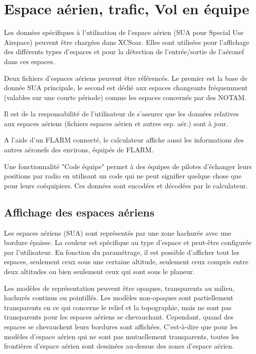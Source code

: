 \chapter{Espace aérien, trafic, Vol en équipe}\label{cha:airspace}
Les données spécifiques à l'utilisation de l'espace aérien (SUA pour Special Use Airspace) peuvent être chargées dans XCSoar. Elles sont utilisées pour l'affichage des différents types d'espaces et pour la détection de l'entrée/sortie de l'aéronef dans ces espaces.

Deux fichiers d'espaces aériens peuvent être référencés. Le premier est la base de donnée SUA principale, le second est dédié aux espaces changeants fréquemment (valables sur une courte période) comme les espaces concernés par des NOTAM.

Il est de la responsabilité de l'utilisateur de s'assurer que les données relatives aux espaces aériens (fichiers espaces aérien et autres esp. aér.) sont à jour.

A l'aide d'un FLARM connecté, le calculateur affiche aussi les informations des autres aéronefs des environs, équipés de FLARM.

Une fonctionnalité "Code équipe" permet à des équipes de pilotes d'échanger leurs positions par radio en utilisant un code qui ne peut signifier quelque chose que pour leurs coéquipiers. Ces données sont encodées et décodées par le calculateur.

\section{Affichage des espaces aériens}
Les espaces aériens (SUA) sont représentés par une zone hachurée avec une bordure épaisse. La couleur est spécifique au type d'espace et peut-être configurée par l'utilisateur. En fonction du paramétrage, il est possible d'afficher tout les espaces, seulement ceux sous une certaine altitude, seulement ceux compris entre deux altitudes ou bien seulement ceux qui sont sous le planeur.  

Les modèles de représentation peuvent être opaques, transparents au milieu, hachurés  continus ou pointillés. Les modèles non-opaques sont partiellement transparents en ce qui concerne le relief et la topographie, mais ne sont pas transparents pour les espaces aériens se chevauchant. Cependant, quand des espaces se chevauchent leurs bordures sont affichées. C'est-à-dire que pour les modèles d'espace aérien qui ne sont pas mutuellement transparents, toutes les frontières d'espace aérien sont dessinées au-dessus des zones d'espace aérien.

